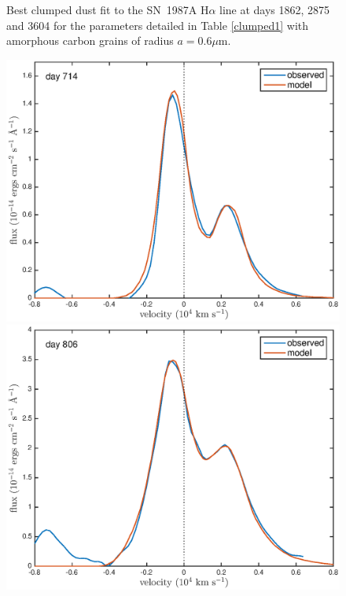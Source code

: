 \documentclass[useAMS,usenatbib,usegraphicx]{mnras}
\begin{document}
\begin{figure}
\caption{Best clumped dust fit to the SN~1987A  H$\alpha$ line at days 1862, 2875 and 
3604 for the parameters detailed in Table \ref{clumped1} with amorphous carbon grains of radius $a=0.6\mu$m.}
\label{d1862_3604_c}

\end{figure}


\begin{figure}
\begin{center}
\includegraphics[trim =37 10 45 15,clip=true,scale=0.41]{clump_1/maximum/d714OI}
\includegraphics[trim =35 10 45 15,clip=true,scale=0.41]{clump_1/maximum/d806OI}

\end{center}
\end{figure}
\end{document}
